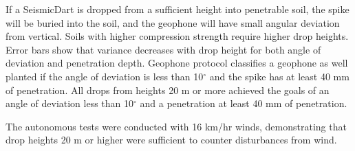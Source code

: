 If a SeismicDart is dropped from a sufficient height into penetrable soil, the spike will be buried into the soil, and the geophone will have small angular deviation from vertical. Soils with higher compression strength require higher drop heights. Error bars show that variance decreases with drop height for both angle of deviation and penetration depth.  Geophone protocol classifies a geophone as well planted if the angle of deviation is less than 10$^\circ$ and the spike has at least 40 mm of penetration. All drops from heights 20 m or more achieved the goals of an angle of deviation less than 10$^\circ$ and a penetration at least 40 mm of penetration.   

The autonomous tests were conducted with 16 km/hr winds, demonstrating that drop heights 20 m or higher were sufficient to counter disturbances from wind. %








